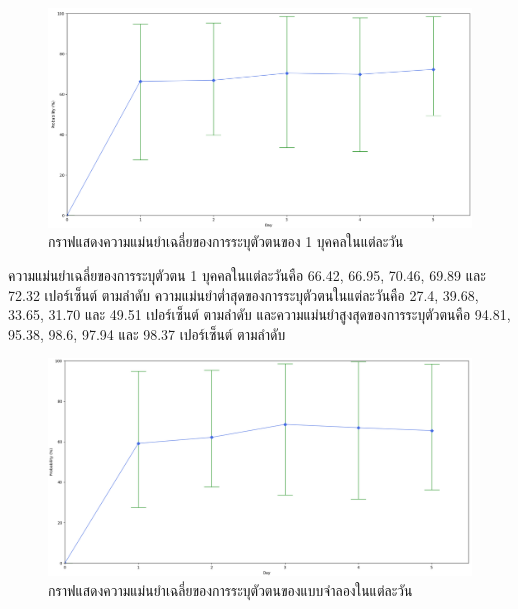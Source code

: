 \begin{figure}[!ht]
    \begin{center}
      \includegraphics[scale=.35]{pic/acc_note.png}
      \caption[กราฟแสดงความแม่นยำเฉลี่ยของการระบุตัวตนของ 1 บุคคลในแต่ละวัน]{กราฟแสดงความแม่นยำเฉลี่ยของการระบุตัวตนของ 1 บุคคลในแต่ละวัน}
      \label{fig:face_graph}
    \end{center}
  \end{figure}

\indent ความแม่นยำเฉลี่ยของการระบุตัวตน 1 บุคคลในแต่ละวันคือ 66.42, 66.95, 70.46, 69.89 และ 72.32 เปอร์เซ็นต์ ตามลำดับ ความแม่นยำต่ำสุดของการระบุตัวตนในแต่ละวันคือ 27.4, 39.68, 33.65, 31.70 และ 49.51 เปอร์เซ็นต์ 
ตามลำดับ และความแม่นยำสูงสุดของการระบุตัวตนคือ 94.81, 95.38, 98.6, 97.94 และ 98.37 เปอร์เซ็นต์ ตามลำดับ


\begin{figure}[!ht]
    \begin{center}
      \includegraphics[scale=.35]{pic/acc_all.png}
      \caption[กราฟแสดงความแม่นยำเฉลี่ยของการระบุตัวตนของแบบจำลองในแต่ละวัน]{กราฟแสดงความแม่นยำเฉลี่ยของการระบุตัวตนของแบบจำลองในแต่ละวัน}
      \label{fig:face_graph_all}
    \end{center}
  \end{figure}

